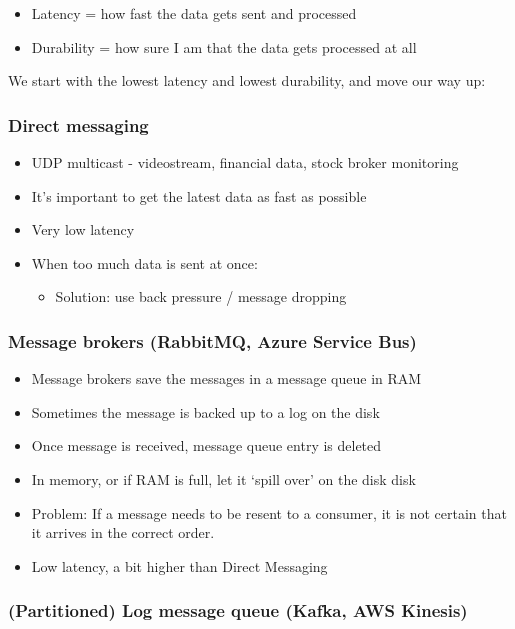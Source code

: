 \documentclass{article}
\begin{document}
\begin{itemize}
    \item Latency = how fast the data gets sent and processed
    \item Durability = how sure I am that the data gets processed at all
\end{itemize}

We start with the lowest latency and lowest durability, and move our way up:

\subsubsection{Direct messaging}

\begin{itemize}
    \item UDP multicast - videostream, financial data, stock broker monitoring
    \item It's important to get the latest data as fast as possible
    \item Very low latency
    \item When too much data is sent at once:
    \begin{itemize}
        \item Solution: use back pressure / message dropping
    \end{itemize}
\end{itemize}

\subsubsection{Message brokers (RabbitMQ, Azure Service Bus)}

\begin{itemize}
    \item Message brokers save the messages in a message queue in RAM
    \item Sometimes the message is backed up to a log on the disk
    \item Once message is received, message queue entry is deleted
    \item In memory, or if RAM is full, let it `spill over' on the disk disk
    \item Problem: If a message needs to be resent to a consumer, it is not certain that it arrives in the correct order.
    \item Low latency, a bit higher than Direct Messaging
\end{itemize}

\subsubsection{(Partitioned) Log message queue (Kafka, AWS Kinesis)}
\end{document}
